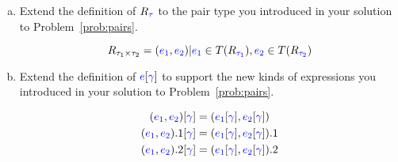 \documentclass{article}
\newcommand{\meta}[1]{{\color{blue}#1}}
\begin{document}
\begin{enumerate}[resume*]
\begin{enumerate}[(a)]
  \item Extend the definition of $R_{\meta{\tau}}$ to the pair type you introduced in your solution to Problem~\ref{prob:pairs}.

    $$R_{\tau_1 \times \tau_2}=\set{(\meta{e_1}, \meta{e_2}) | \meta{e_1} \in T(R_{\meta{\tau_1}}), \meta{e_2} \in T(R_{\meta{\tau_2}})}$$

  \item Extend the definition of $\meta{e}[\meta{\gamma}]$ to support the new
    kinds of expressions you introduced in your solution to
    Problem~\ref{prob:pairs}.

    \begin{align*}
      (\meta{e_1}, \meta{e_2})[\meta{\gamma}] &= (\meta{e_1}[\meta{\gamma}], \meta{e_2}[\meta{\gamma}])\\
      (\meta{e_1}, \meta{e_2}).1[\meta{\gamma}] &= (\meta{e_1}[\meta{\gamma}], \meta{e_2}[\meta{\gamma}]).1\\
      (\meta{e_1}, \meta{e_2}).2[\meta{\gamma}] &= (\meta{e_1}[\meta{\gamma}], \meta{e_2}[\meta{\gamma}]).2
    \end{align*}


\end{enumerate}
\end{enumerate}
\end{document}
